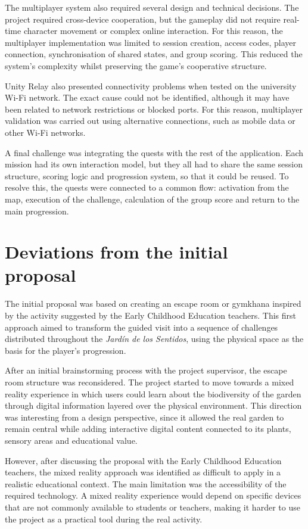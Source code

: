 The multiplayer system also required several design and technical decisions. The project required cross-device cooperation, but the gameplay did not require real-time character movement or complex online interaction. For this reason, the multiplayer implementation was limited to session creation, access codes, player connection, synchronisation of shared states, and group scoring. This reduced the system’s complexity whilst preserving the game’s cooperative structure.

Unity Relay also presented connectivity problems when tested on the university Wi-Fi network. The exact cause could not be identified, although it may have been related to network restrictions or blocked ports. For this reason, multiplayer validation was carried out using alternative connections, such as mobile data or other Wi-Fi networks.

A final challenge was integrating the quests with the rest of the application. Each mission had its own interaction model, but they all had to share the same session structure, scoring logic and progression system, so that it could be reused. To resolve this, the quests were connected to a common flow: activation from the map, execution of the challenge, calculation of the group score and return to the main progression.

\section{Deviations from the initial proposal}
The initial proposal was based on creating an escape room or gymkhana inspired by the activity suggested by the Early Childhood Education teachers. This first approach aimed to transform the guided visit into a sequence of challenges distributed throughout the \textit{Jardín de los Sentidos}, using the physical space as the basis for the player’s progression.

After an initial brainstorming process with the project supervisor, the escape room structure was reconsidered. The project started to move towards a mixed reality experience in which users could learn about the biodiversity of the garden through digital information layered over the physical environment. This direction was interesting from a design perspective, since it allowed the real garden to remain central while adding interactive digital content connected to its plants, sensory areas and educational value.

However, after discussing the proposal with the Early Childhood Education teachers, the mixed reality approach was identified as difficult to apply in a realistic educational context. The main limitation was the accessibility of the required technology. A mixed reality experience would depend on specific devices that are not commonly available to students or teachers, making it harder to use the project as a practical tool during the real activity.

